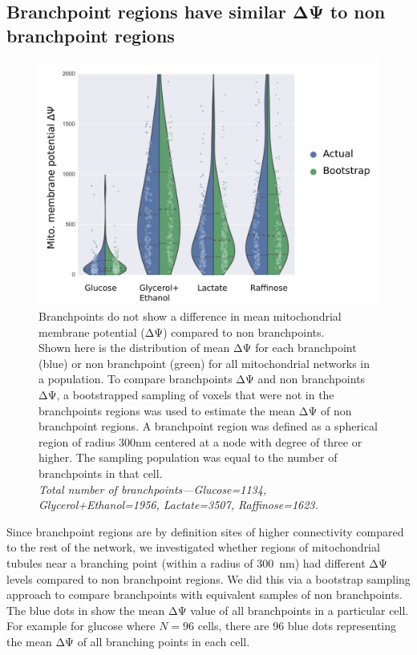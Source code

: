 \subsection{Branchpoint regions have similar ΔΨ to non branchpoint regions}
%
\begin{figure}[htp]
	\centering
    \hspace*{.8in}\includegraphics[width=.75\textwidth]{bpoints}
    \caption[Branchpoints do not show a difference in mean mitochondrial membrane potential (ΔΨ) compared to non branchpoints]{Branchpoints do not show a difference in mean mitochondrial membrane potential (ΔΨ) compared to non branchpoints.\\Shown here is the distribution of mean ΔΨ for each branchpoint (blue) or non branchpoint (green) for all mitochondrial networks in a population. To compare branchpoints ΔΨ and non branchpoints ΔΨ, a bootstrapped sampling of voxels that were not in the branchpoints regions was used to estimate the mean ΔΨ of non branchpoint regions. A branchpoint region was defined as a spherical region of radius 300nm centered at a node with degree of three or higher. The sampling population was equal to the number of branchpoints in that cell.\\\emph{Total number of branchpoints---Glucose=1134, Glycerol+Ethanol=1956, Lactate=3507, Raffinose=1623.}}\label{fig:bpoints}
\end{figure}
%
Since branchpoint regions are by definition sites of higher connectivity compared to the rest of the network, we investigated whether regions of mitochondrial tubules near a branching point (within a radius of \SI{300}{\nm}) had different ΔΨ levels compared to non branchpoint regions. We did this via a bootstrap sampling approach to compare branchpoints with equivalent samples of non branchpoints. The blue dots in  show the mean ΔΨ value of all branchpoints in a particular cell. For example for glucose where $N=96$ cells, there are 96 blue dots representing the mean ΔΨ of all branching points in each cell.

